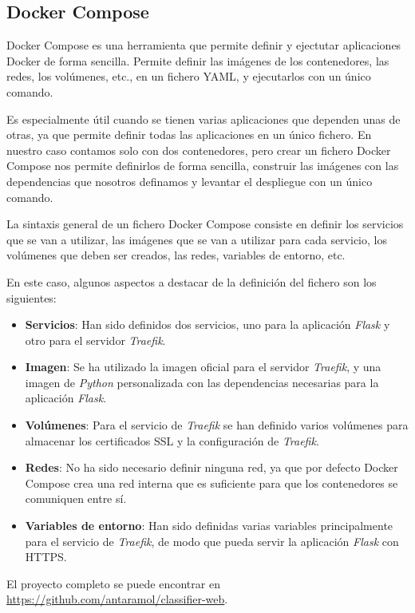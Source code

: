 \subsection{Docker Compose}
Docker Compose es una herramienta que permite definir y ejectutar aplicaciones Docker de forma sencilla.
Permite definir las imágenes de los contenedores, las redes, los volúmenes, etc., en un fichero YAML, y ejecutarlos con un único comando.

Es especialmente útil cuando se tienen varias aplicaciones que dependen unas de otras, ya que permite definir todas las aplicaciones en un único fichero.
En nuestro caso contamos solo con dos contenedores, pero crear un fichero Docker Compose nos permite definirlos de forma sencilla, construir las imágenes con las dependencias que nosotros definamos y levantar el despliegue con un único comando.

La sintaxis general de un fichero Docker Compose consiste en definir los servicios que se van a utilizar, las imágenes que se van a utilizar para cada servicio, los volúmenes que deben ser creados, las redes, variables de entorno, etc.

En este caso, algunos aspectos a destacar de la definición del fichero son los siguientes:

\begin{itemize}
    \item \textbf{Servicios}: Han sido definidos dos servicios, uno para la aplicación \textit{Flask} y otro para el servidor \textit{Traefik}.
    \item \textbf{Imagen}: Se ha utilizado la imagen oficial para el servidor \textit{Traefik}, y una imagen de \textit{Python} personalizada con las dependencias necesarias para la aplicación \textit{Flask}.
    \item \textbf{Volúmenes}: Para el servicio de \textit{Traefik} se han definido varios volúmenes para almacenar los certificados SSL y la configuración de \textit{Traefik}.
    \item \textbf{Redes}: No ha sido necesario definir ninguna red, ya que por defecto Docker Compose crea una red interna que es suficiente para que los contenedores se comuniquen entre sí.
    \item \textbf{Variables de entorno}: Han sido definidas varias variables principalmente para el servicio de \textit{Traefik}, de modo que pueda servir la aplicación \textit{Flask} con HTTPS.
\end{itemize}

El proyecto completo se puede encontrar en \url{https://github.com/antaramol/classifier-web}.

